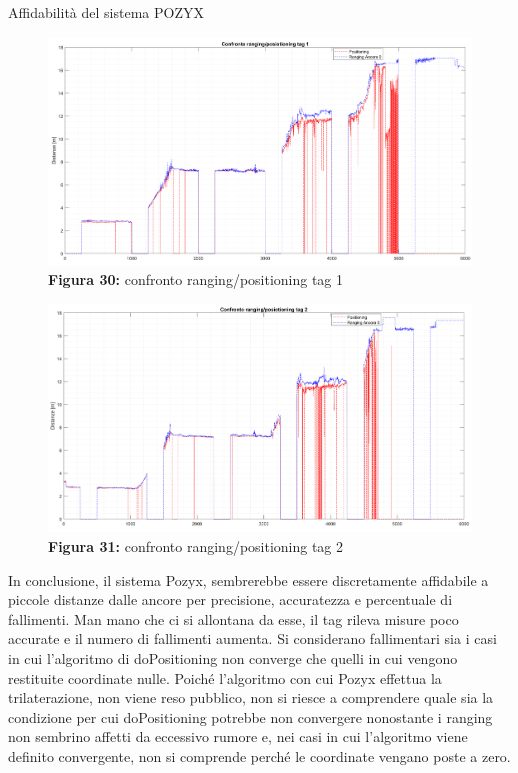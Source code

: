 \documentclass[12pt]{report}
\begin{document}
\begin{section}{Affidabilità del sistema POZYX}
		\begin{figure}[H]
			\centering
			\includegraphics[scale=0.18]{PosRangTag1}
			\caption{\textbf{Figura 30:} confronto ranging/positioning tag 1\label{PosRangTag1}}
		\end{figure}
		\begin{figure}[H]
			\centering
			\includegraphics[scale=0.18]{PosRangTag2}
			\caption{\textbf{Figura 31:} confronto ranging/positioning tag 2\label{PosRangTag2}}
		\end{figure} 
		In conclusione, il sistema Pozyx, sembrerebbe essere discretamente affidabile a piccole distanze dalle ancore per precisione, accuratezza e percentuale di fallimenti. Man mano che ci si allontana da esse, il tag rileva misure poco accurate e il numero di fallimenti aumenta. Si considerano fallimentari sia i casi in cui 				l’algoritmo di doPositioning non converge che quelli in cui vengono restituite coordinate nulle. Poiché l’algoritmo con cui Pozyx effettua la trilaterazione, non viene reso pubblico, non si riesce a comprendere quale sia la condizione per cui doPositioning potrebbe non convergere nonostante i ranging non sembrino 				affetti da eccessivo rumore e, nei casi in cui l’algoritmo viene definito convergente, non si comprende perché le coordinate vengano poste a zero.

	\end{section}
	\newpage
\end{document}
